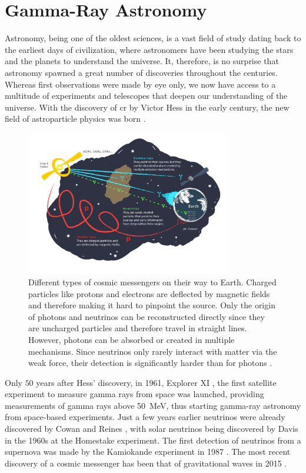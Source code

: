 \chapter{Gamma-Ray Astronomy}
\label{ch:gamma-ray-astronomy}

Astronomy, being one of the oldest sciences, is a vast field of study dating back to the earliest
days of civilization, where astronomers have been studying the stars and the planets to understand
the universe. It, therefore, is no surprise that astronomy spawned a great number of discoveries
throughout the centuries. Whereas first observations were made by eye only, we now have access to a multitude
of experiments and telescopes that deepen our understanding of the universe. With the discovery of
\gls{cr} by Victor Hess in the early  century, the new field of astroparticle physics was born \cite{longair1981}.

\begin{figure}
    \centering
    \includegraphics[width=0.8\textwidth]{graphics/figure5.png}
    \caption{Different types of cosmic messengers on their way to Earth. Charged particles like protons and electrons
    are deflected by magnetic fields and therefore making it hard to pinpoint the source. Only the
    origin of photons and neutrinos can be reconstructed directly since they are uncharged particles
    and therefore travel in straight lines. However, photons can be absorbed or created in multiple
    mechanisms. Since neutrinos only rarely interact with matter via the weak force, their detection
    is significantly harder than for photons \cite{fig5}.}
    \label{fig:fig5}
\end{figure}

Only \(\num{50}\) years after Hess' discovery, in 1961, Explorer XI \cite{explorer11}, the first satellite experiment
to measure gamma rays from space was launched, providing measurements of gamma rays above
\SI{50}{\mega\eV}, thus starting gamma-ray astronomy from space-based experiments. Just a few years
earlier neutrinos were already discovered by Cowan and Reines \cite{cowan1956}, with solar neutrinos being
discovered by Davis \etal{} \cite{davis} in the 1960s at the Homestake experiment.
The first detection of neutrinos from a supernova was made by the Kamiokande experiment in 1987
\cite{kamiokande1987}. The most recent discovery of a cosmic messenger has been that of gravitational
waves in 2015 \cite{grav_waves}.

